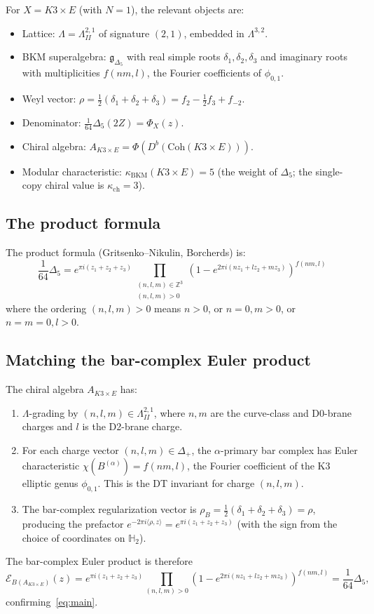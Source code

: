 \documentclass[11pt]{article}
\theoremstyle{definition}
\theoremstyle{remark}
\newcommand{\frakg}{\mathfrak{g}}
\begin{document}
For $X = K3 \times E$ (with $N=1$), the relevant objects are:
\begin{itemize}[itemsep=2pt]
\item Lattice: $\Lambda = \Lambda^{2,1}_{II}$ of signature $(2,1)$, embedded
 in $\Lambda^{3,2}$.
\item BKM superalgebra: $\frakg_{\Delta_5}$ with real simple roots
 $\delta_1, \delta_2, \delta_3$ and imaginary roots with multiplicities
 $f(nm,l)$, the Fourier coefficients of $\phi_{0,1}$.
\item Weyl vector: $\rho = \frac{1}{2}(\delta_1 + \delta_2 + \delta_3)
 = f_2 - \frac{1}{2}f_3 + f_{-2}$.
\item Denominator: $\frac{1}{64}\Delta_5(2Z) = \Phi_X(z)$.
\item Chiral algebra: $A_{K3 \times E} = \Phi(D^b(\mathrm{Coh}(K3 \times E)))$.
\item Modular characteristic: $\kappa_{\mathrm{BKM}}(K3 \times E) = 5$ (the weight of $\Delta_5$; the single-copy chiral value is $\kappa_{\mathrm{ch}} = 3$).
\end{itemize}

\subsection{The product formula}

The product formula (Gritsenko--Nikulin, Borcherds) is:
\begin{equation}
\label{eq:k3e-product}
 \frac{1}{64}\Delta_5
 = e^{\pi i(z_1+z_2+z_3)}
 \prod_{\substack{(n,l,m) \in \mathbb{Z}^3 \\ (n,l,m) > 0}}
 (1 - e^{2\pi i(nz_1 + lz_2 + mz_3)})^{f(nm,l)}
\end{equation}
where the ordering $(n,l,m) > 0$ means $n > 0$, or $n=0, m > 0$, or
$n=m=0, l > 0$.

\subsection{Matching the bar-complex Euler product}

The chiral algebra $A_{K3 \times E}$ has:
\begin{enumerate}[label=(\roman*)]
\item $\Lambda$-grading by $(n,l,m) \in \Lambda^{2,1}_{II}$, where $n,m$
 are the curve-class and D0-brane charges and $l$ is the D2-brane charge.
\item For each charge vector $(n,l,m) \in \Delta_+$, the $\alpha$-primary
 bar complex has Euler characteristic $\chi(B^{(\alpha)}) = f(nm,l)$,
 the Fourier coefficient of the K3 elliptic genus $\phi_{0,1}$.
 This is the DT invariant for charge $(n,l,m)$.
\item The bar-complex regularization vector is
 $\rho_B = \frac{1}{2}(\delta_1 + \delta_2 + \delta_3) = \rho$,
 producing the prefactor $e^{-2\pi i\langle\rho,z\rangle}
 = e^{\pi i(z_1 + z_2 + z_3)}$ (with the sign from the choice of
 coordinates on $\mathbb{H}_2$).
\end{enumerate}
The bar-complex Euler product is therefore
\[
 \mathcal{E}_{B(A_{K3\times E})}(z)
 = e^{\pi i(z_1+z_2+z_3)}
 \prod_{(n,l,m)>0}
 (1 - e^{2\pi i(nz_1+lz_2+mz_3)})^{f(nm,l)}
 = \frac{1}{64}\Delta_5,
\]
confirming~\eqref{eq:main}.
\end{document}

